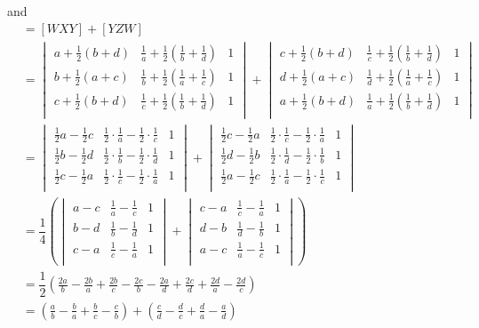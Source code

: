 \documentclass{article}
\begin{document}
and
\begin{align*}
[WXYZ] &= [WXY]+[YZW] \\
&= \begin{vmatrix}a+\tfrac{1}{2}(b+d)&\tfrac{1}{a}+\tfrac{1}{2}\left(\tfrac{1}{b}+\tfrac{1}{d}\right)&1\\[3pt]b+\tfrac{1}{2}(a+c)&\tfrac{1}{b}+\tfrac{1}{2}\left(\tfrac{1}{a}+\tfrac{1}{c}\right)&1\\[3pt]c+\tfrac{1}{2}(b+d)&\tfrac{1}{c}+\tfrac{1}{2}\left(\tfrac{1}{b}+\tfrac{1}{d}\right)&1\\\end{vmatrix} + \begin{vmatrix}c+\tfrac{1}{2}(b+d)&\tfrac{1}{c}+\tfrac{1}{2}\left(\tfrac{1}{b}+\tfrac{1}{d}\right)&1\\[3pt]d+\tfrac{1}{2}(a+c)&\tfrac{1}{d}+\tfrac{1}{2}\left(\tfrac{1}{a}+\tfrac{1}{c}\right)&1\\[3pt]a+\tfrac{1}{2}(b+d)&\tfrac{1}{a}+\tfrac{1}{2}\left(\tfrac{1}{b}+\tfrac{1}{d}\right)&1\\\end{vmatrix} \\
&= \begin{vmatrix}\tfrac{1}{2}a-\tfrac{1}{2}c&\tfrac{1}{2}\cdot\tfrac{1}{a}-\tfrac{1}{2}\cdot\tfrac{1}{c}&1\\[3pt]\tfrac{1}{2}b-\tfrac{1}{2}d&\tfrac{1}{2}\cdot\tfrac{1}{b}-\tfrac{1}{2}\cdot\tfrac{1}{d}&1\\[3pt]\tfrac{1}{2}c-\tfrac{1}{2}a&\tfrac{1}{2}\cdot\tfrac{1}{c}-\tfrac{1}{2}\cdot\tfrac{1}{a}&1\\\end{vmatrix} + \begin{vmatrix}\tfrac{1}{2}c-\tfrac{1}{2}a&\tfrac{1}{2}\cdot\tfrac{1}{c}-\tfrac{1}{2}\cdot\tfrac{1}{a}&1\\[3pt]\tfrac{1}{2}d-\tfrac{1}{2}b&\tfrac{1}{2}\cdot\tfrac{1}{d}-\tfrac{1}{2}\cdot\tfrac{1}{b}&1\\[3pt]\tfrac{1}{2}a-\tfrac{1}{2}c&\tfrac{1}{2}\cdot\tfrac{1}{a}-\tfrac{1}{2}\cdot\tfrac{1}{c}&1\\\end{vmatrix} \\
&= \dfrac{1}{4}\left(\begin{vmatrix}a-c&\tfrac{1}{a}-\tfrac{1}{c}&1\\[3pt]b-d&\tfrac{1}{b}-\tfrac{1}{d}&1\\[3pt]c-a&\tfrac{1}{c}-\tfrac{1}{a}&1\\\end{vmatrix} + \begin{vmatrix}c-a&\tfrac{1}{c}-\tfrac{1}{a}&1\\[3pt]d-b&\tfrac{1}{d}-\tfrac{1}{b}&1\\[3pt]a-c&\tfrac{1}{a}-\tfrac{1}{c}&1\\\end{vmatrix}\right) \\
&= \dfrac{1}{2}\left(\tfrac{2a}{b} - \tfrac{2b}{a} + \tfrac{2b}{c} - \tfrac{2c}{b} - \tfrac{2a}{d} + \tfrac{2c}{d} + \tfrac{2d}{a} - \tfrac{2d}{c}\right) \\
&= \left(\tfrac{a}{b}-\tfrac{b}{a}+\tfrac{b}{c}-\tfrac{c}{b}\right) + \left(\tfrac{c}{d}-\tfrac{d}{c}+\tfrac{d}{a}-\tfrac{a}{d}\right)
\end{align*}
\end{document}
